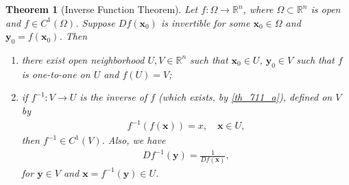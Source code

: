 \documentclass[11pt]{book}
\newtheorem{theorem}{Theorem}[chapter]
\theoremstyle{definition}
\numberwithin{equation}{chapter}
\begin{document}
\begin{theorem}[Inverse Function Theorem]\label{th_711}
Let $f: \Omega \to \mathbb{R}^n$, where $\Omega \subset \mathbb{R}^n$ is open and $f \in C^1(\Omega)$. Suppose $Df(\mathbf{x}_0)$ is invertible for some $\mathbf{x}_0 \in \Omega$ and $\mathbf{y}_0 = f(\mathbf{x}_0)$. Then
\begin{enumerate}[label=(\alph*)]
    \item there exist open neighborhood $U, V \in \mathbb{R}^n$ such that $\mathbf{x}_0 \in U$, $\mathbf{y}_0 \in V$ such that $f$ is one-to-one on $U$ and $f(U) = V$; \label{th_711_a}
    
    \item if $f^{-1}: V \to U$ is the inverse of $f$ (which exists, by \ref{th_711_a}), defined on $V$ by
    \begin{align*}
        f^{-1}(f(\mathbf{x})) = x, \quad \mathbf{x} \in U,
    \end{align*}
    then $f^{-1} \in C^1(V)$. Also, we have
    \begin{align*}
        Df^{-1}(\mathbf{y}) = \frac{1}{Df(\mathbf{x})},
    \end{align*}
    for $\mathbf{y} \in V$ and $\mathbf{x} = f^{-1}(\mathbf{y}) \in U$. \label{th_711_b}
\end{enumerate}
\end{theorem}
\end{document}
